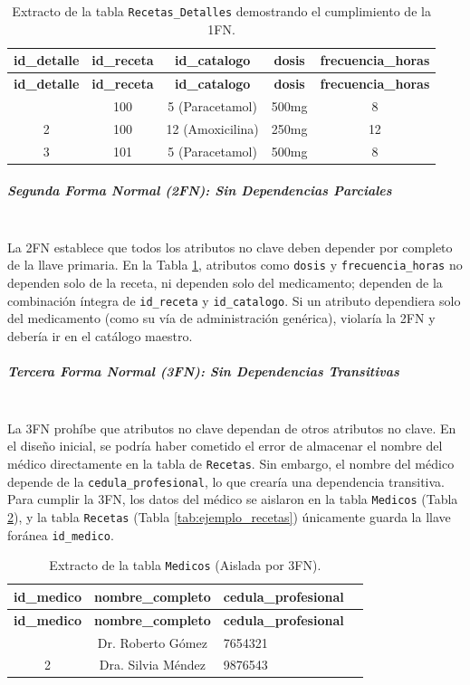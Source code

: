 \begin{longtable}{|c|c|c|c|c|}
\caption{Extracto de la tabla \texttt{Recetas\_Detalles} demostrando el cumplimiento de la 1FN.}
\label{tab:ejemplo_recetas_detalles} \\
\hline
\textbf{id\_detalle} & \textbf{id\_receta} & \textbf{id\_catalogo} & \textbf{dosis} & \textbf{frecuencia\_horas} \\
\hline
\endfirsthead
\hline
\textbf{id\_detalle} & \textbf{id\_receta} & \textbf{id\_catalogo} & \textbf{dosis} & \textbf{frecuencia\_horas} \\
\hline
\endhead
\hline
\endfoot
\hline
\endlastfoot
1 & 100 & 5 (Paracetamol) & 500mg & 8 \\
\hline
2 & 100 & 12 (Amoxicilina) & 250mg & 12 \\
\hline
3 & 101 & 5 (Paracetamol) & 500mg & 8 \\
\hline
\end{longtable}

\subparagraph{Segunda Forma Normal (2FN): Sin Dependencias Parciales} \leavevmode \\
La 2FN establece que todos los atributos no clave deben depender por completo de la llave primaria. En la Tabla \ref{tab:ejemplo_recetas_detalles}, atributos como \texttt{dosis} y \texttt{frecuencia\_horas} no dependen solo de la receta, ni dependen solo del medicamento; dependen de la combinación íntegra de \texttt{id\_receta} y \texttt{id\_catalogo}. Si un atributo dependiera solo del medicamento (como su vía de administración genérica), violaría la 2FN y debería ir en el catálogo maestro.

\subparagraph{Tercera Forma Normal (3FN): Sin Dependencias Transitivas} \leavevmode \\
La 3FN prohíbe que atributos no clave dependan de otros atributos no clave. En el diseño inicial, se podría haber cometido el error de almacenar el nombre del médico directamente en la tabla de \texttt{Recetas}. Sin embargo, el nombre del médico depende de la \texttt{cedula\_profesional}, lo que crearía una dependencia transitiva. Para cumplir la 3FN, los datos del médico se aislaron en la tabla \texttt{Medicos} (Tabla \ref{tab:ejemplo_medicos}), y la tabla \texttt{Recetas} (Tabla \ref{tab:ejemplo_recetas}) únicamente guarda la llave foránea \texttt{id\_medico}.

\begin{longtable}{|c|c|l|c|}
\caption{Extracto de la tabla \texttt{Medicos} (Aislada por 3FN).}
\label{tab:ejemplo_medicos} \\
\hline
\textbf{id\_medico} & \textbf{nombre\_completo} & \textbf{cedula\_profesional} \\
\hline
\endfirsthead
\hline
\textbf{id\_medico} & \textbf{nombre\_completo} & \textbf{cedula\_profesional} \\
\hline
\endhead
\hline
\endfoot
\hline
\endlastfoot
1 & Dr. Roberto Gómez & 7654321 \\
\hline
2 & Dra. Silvia Méndez & 9876543  \\
\hline
\end{longtable}


